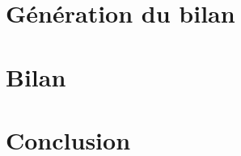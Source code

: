 \documentclass[a4paper,11pt]{article}
\begin{document}
\section{Génération du bilan }
 

\section{Bilan }
  

\section*{Conclusion}
  


\end{document}
